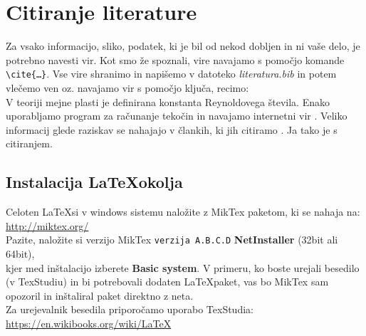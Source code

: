 \documentclass[11pt,a4]{article}
\begin{document}
\section{Citiranje literature}
Za vsako informacijo, sliko, podatek, ki je bil od nekod dobljen in ni vaše delo, je potrebno navesti vir. Kot smo že spoznali, vire navajamo s pomočjo komande \texttt{\textbackslash cite\{\ldots\}}. Vse vire shranimo in napišemo v datoteko \textit{literatura.bib} in potem vlečemo ven oz. navajamo vir s pomočjo ključa, recimo:\\
V teoriji mejne plasti \cite{boundary_layer_theory} je definirana konstanta Reynoldovega števila. Enako uporabljamo program za računanje tekočin \cite{openfoam} in navajamo internetni vir \cite{cfd_online_skin_friction}. Veliko informacij glede raziskav se nahajajo v člankih, ki jih citiramo \cite{bird_et_all}. Ja tako je s citiranjem.

\subsection{Instalacija \LaTeX okolja}
Celoten \LaTeX si v windows sistemu naložite z MikTex paketom, ki se nahaja na:\\[0.2cm]
\url{http://miktex.org/}\\[0.2cm]
Pazite, naložite si verzijo MikTex \texttt{verzija A.B.C.D} \textbf{NetInstaller} (32bit ali 64bit),\\[0.2cm]
kjer med inštalacijo izberete \textbf{Basic system}. V primeru, ko boste urejali besedilo (v TexStudiu) in bi potrebovali dodaten \LaTeX paket, vas bo MikTex sam opozoril in inštaliral paket direktno z neta.\\[0.5cm]

Za urejevalnik besedila priporočamo uporabo TexStudia:\\[0.2cm]
\url{https://en.wikibooks.org/wiki/LaTeX}


\newpage


\end{document}

